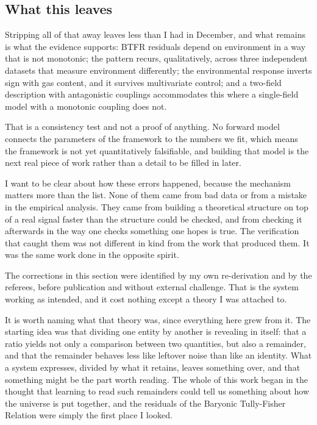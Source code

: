 \documentclass[12pt,a4paper]{article}
\begin{document}
\subsection{What this leaves}

Stripping all of that away leaves less than I had in December, and what remains is what the evidence supports: BTFR residuals depend on environment in a way that is not monotonic; the pattern recurs, qualitatively, across three independent datasets that measure environment differently; the environmental response inverts sign with gas content, and it survives multivariate control; and a two-field description with antagonistic couplings accommodates this where a single-field model with a monotonic coupling does not.

That is a consistency test and not a proof of anything. No forward model connects the parameters of the framework to the numbers we fit, which means the framework is not yet quantitatively falsifiable, and building that model is the next real piece of work rather than a detail to be filled in later.

I want to be clear about how these errors happened, because the mechanism matters more than the list. None of them came from bad data or from a mistake in the empirical analysis. They came from building a theoretical structure on top of a real signal faster than the structure could be checked, and from checking it afterwards in the way one checks something one hopes is true. The verification that caught them was not different in kind from the work that produced them. It was the same work done in the opposite spirit.

The corrections in this section were identified by my own re-derivation and by the referees, before publication and without external challenge. That is the system working as intended, and it cost nothing except a theory I was attached to.

It is worth naming what that theory was, since everything here grew from it. The starting idea was that dividing one entity by another is revealing in itself: that a ratio yields not only a comparison between two quantities, but also a remainder, and that the remainder behaves less like leftover noise than like an identity. What a system expresses, divided by what it retains, leaves something over, and that something might be the part worth reading. The whole of this work began in the thought that learning to read such remainders could tell us something about how the universe is put together, and the residuals of the Baryonic Tully-Fisher Relation were simply the first place I looked.
\end{document}
